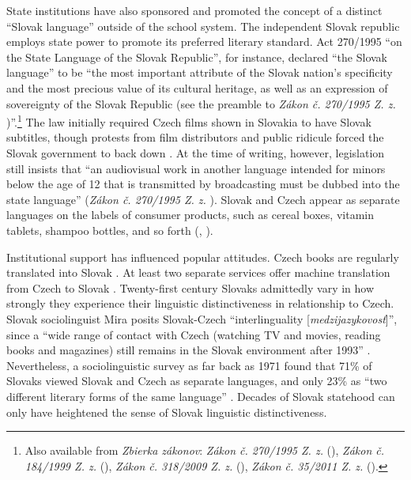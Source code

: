 State institutions have also sponsored and promoted the concept of a distinct “Slovak language” outside of the school system. The independent Slovak republic employs state power to promote its preferred literary standard. Act 270/1995 “on the State Language of the Slovak Republic”, for instance, declared “the Slovak language” to be “the most important attribute of the Slovak nation’s specificity and the most precious value of its cultural heritage, as well as an expression of sovereignty of the Slovak Republic (see the preamble to \textit{Zákon č. 270/1995 Z. z.} \citeyear[1999--2002]{noauthor_zakon_1995})”.\footnote{Also available from \textit{Zbierka zákonov}: \textit{Zákon č. 270/1995 Z. z.} (\citeyear[1999--2002]{noauthor_zakon_1995}), \textit{Zákon č. 184/1999 {Z}. z.} (\citeyear[1418--1419]{noauthor_zakon_1999}), \textit{Zákon č. 318/2009 {Z}. z.} (\citeyear[2362--2367]{noauthor_zakon_2009}), \textit{Zákon č. 35/2011 {Z}. z.} (\citeyear[388--389]{noauthor_zakon_2011}).} The law initially required Czech films shown in Slovakia to have Slovak subtitles, though protests from film distributors and public ridicule forced the Slovak government to back down \citep[109]{fisher_political_2006}. At the time of writing, however, legislation still insists that “an audiovisual work in another language intended for minors below the age of 12 that is transmitted by broadcasting must be dubbed into the state language” (\textit{Zákon č. 270/1995 Z. z.} \citeyear[§5(2)]{noauthor_zakon_1995}). Slovak and Czech appear as separate languages on the labels of consumer products, such as cereal boxes, vitamin tablets, shampoo bottles, and so forth (\cite[83]{nabelkova_slovencina_1999}, \citeyear[32]{nabelkova_slovencina_2008}).

Institutional support has influenced popular attitudes. Czech books are regularly translated into Slovak \citep[95]{nabelkova_sucasne_2003}. At least two separate services offer machine translation from Czech to Slovak \citep[92--93]{kubon_comparison_2014}. Twenty-first century Slovaks admittedly vary in how strongly they experience their linguistic distinctiveness in relationship to Czech. Slovak sociolinguist Mira \citet[90]{nabelkova_sucasne_2003} posits Slovak-Czech “interlinguality [\textit{medzijazykovosť}]”, \linebreak{}since a “wide range of contact with Czech (watching TV and movies, reading books and magazines) still remains in the Slovak environment after 1993” \linebreak{} \citep[66]{nabelkova_case_2014}. Nevertheless, a sociolinguistic survey as far back as 1971 found that 71\% of Slovaks viewed Slovak and Czech as separate languages, and only 23\% as “two different literary forms of the same language” \citep[24]{salzmann_sociolinguistic_1971}. Decades of Slovak statehood can only have heightened the sense of Slovak linguistic distinctiveness.

